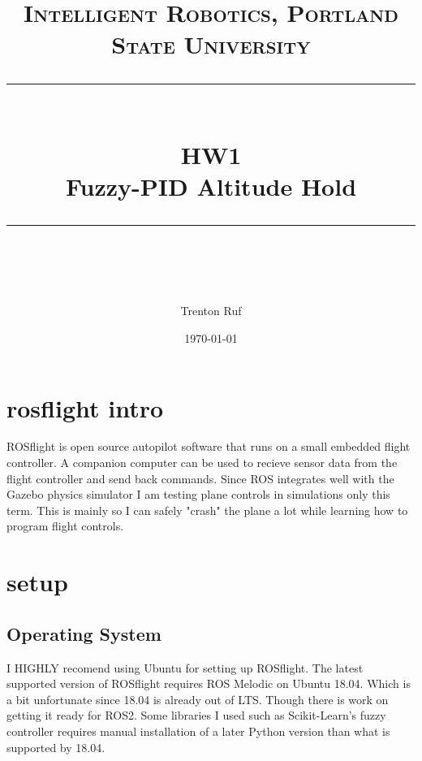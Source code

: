 \documentclass[11pt]{scrartcl} %
\title{	
	\normalfont\normalsize
	\textsc{Intelligent Robotics, Portland State University}\\ %
	\vspace{25pt} %
	\rule{\linewidth}{0.5pt}\\ %
	\vspace{20pt} %
	{\huge HW1}\\ %
	\vspace{4pt} %
	{\large Fuzzy-PID Altitude Hold}\\ %
	\vspace{12pt} %
	\rule{\linewidth}{2pt}\\ %
	\vspace{12pt} %
}
\author{\LARGE Trenton Ruf} %
\date{\normalsize \today} %
\begin{document}
\maketitle %




\renewcommand\thesubsection{\Roman{subsection}}
\section{rosflight intro}

ROSflight is open source autopilot software that runs on a small embedded flight controller. A companion computer can be used to recieve sensor data from the flight controller and send back commands. Since ROS integrates well with the Gazebo physics simulator I am testing plane controls in simulations only this term. This is mainly so I can safely "crash" the plane a lot while learning how to program flight controls.

\section{setup}
\subsection{Operating System}
I HIGHLY recomend using Ubuntu for setting up ROSflight.
The latest supported version of ROSflight requires ROS Melodic on Ubuntu 18.04. Which is a bit unfortunate since 18.04 is already out of LTS. Though there is work on getting it ready for ROS2. Some libraries I used such as Scikit-Learn's fuzzy controller requires manual installation of a later Python version than what is supported by 18.04.
\end{document}
